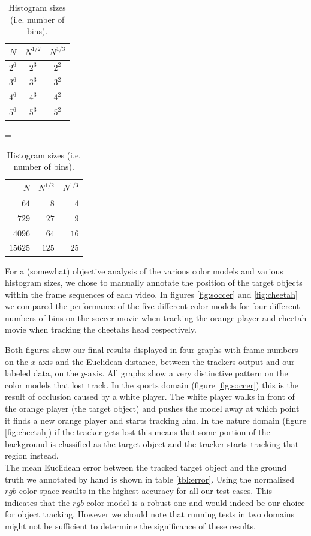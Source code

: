 \documentclass[11pt]{article}
\begin{document}
\begin{table}[!ht]
\centering
\begin{tabular}{c|c|c}
$N$   & $N^{1/2}$ & $N^{1/3}$\\\hline\hline
$2^6$ & $2^3$     & $2^2$\\\hline
$3^6$ & $3^3$     & $3^2$\\\hline
$4^6$ & $4^3$     & $4^2$\\\hline
$5^6$ & $5^3$     & $5^2$\\
\end{tabular}
=
\begin{tabular}{r|r|r}
$N$     & $N^{1/2}$ & $N^{1/3}$\\\hline\hline
$64$    & $8$       & $4$\\\hline
$729$   & $27$      & $9$\\\hline
$4096$  & $64$      & $16$\\\hline
$15625$ & $125$     & $25$\\
\end{tabular}
\caption{Histogram sizes (i.e. number of bins).}
\label{tbl:bins}
\end{table}

For a (somewhat) objective analysis of the various color models and various
histogram sizes, we chose to manually annotate the position of the target
objects within the frame sequences of each video. In figures \ref{fig:soccer}
and \ref{fig:cheetah} we compared the performance of
the five different color models for four different numbers of bins on the soccer
movie when tracking the orange player and cheetah movie when tracking the
cheetahs head respectively.

Both figures show our final results displayed in
four graphs with frame numbers on the $x$-axis and the Euclidean distance,
between the trackers output and our labeled data, on the $y$-axis. All graphs
show a very distinctive pattern on the color models that lost track. In the
sports domain (figure \ref{fig:soccer}) this is the result of occlusion caused by
a white player. The white player walks in front of the orange player (the
target object) and pushes the model away at which point it finds a new orange
player and starts tracking him. In the nature domain (figure \ref{fig:cheetah})
if the tracker gets lost this means that some portion of the background is
classified as the target object and the tracker starts tracking that region
instead.\\

The mean Euclidean error between the tracked target object and the ground truth
we annotated by hand is shown in table \ref{tbl:error}. Using the normalized
$rgb$ color space results in the highest accuracy for all our test cases.
This indicates that the $rgb$ color model is a robust one and would indeed be
our choice for object tracking. However we should note that running tests in two
domains might not be sufficient to determine the significance of these results.
\end{document}
